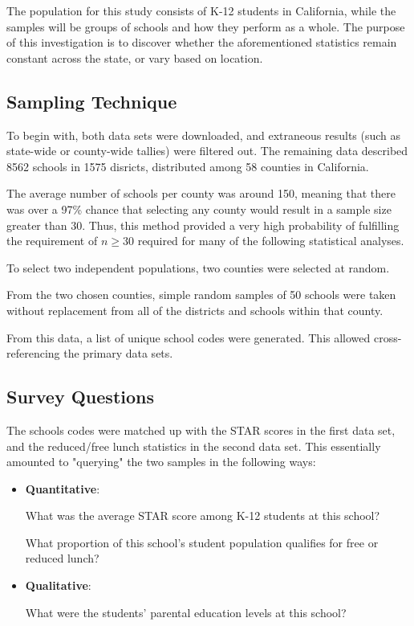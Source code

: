 \documentclass[twocolumn,english]{IEEEtran}
\theoremstyle{plain}
\theoremstyle{plain}
\begin{document}
The population for this study consists of K-12 students in California, while the samples will be groups of schools and how they perform as a whole. The purpose of this investigation is to discover whether the aforementioned statistics remain constant across the state, or vary based on location.

\subsection{Sampling Technique}
To begin with, both data sets were downloaded, and extraneous results (such as state-wide or county-wide tallies) were filtered out. 
The remaining data described 8562 schools in 1575 disricts, distributed among 58 counties in California. 

The average number of schools per county was around 150, meaning that there was over a 97\% chance that selecting any county would result in a sample size greater than 30. 
Thus, this method provided a very high probability of fulfilling the requirement of $n \geq 30$ required for many of the following statistical analyses.

To select two independent populations, two counties were selected at random.

From the two chosen counties, simple random samples of 50 schools were taken without replacement from all of the districts and schools within that county.

From this data, a list of unique school codes were generated. 
This allowed cross-referencing the primary data sets.


\subsection{Survey Questions}
The schools codes were matched up with the STAR scores in the first data set, and the reduced/free lunch statistics in the second data set. 
This essentially amounted to "querying" the two samples in the following ways:

\begin{itemize}
		\item \textbf{Quantitative}:

				What was the average STAR score among K-12 students at this school?

				What proportion of this school's student population qualifies for free or reduced lunch?
		\item \textbf{Qualitative}:

				What were the students' parental education levels at this school?
\end{itemize}
\end{document}
